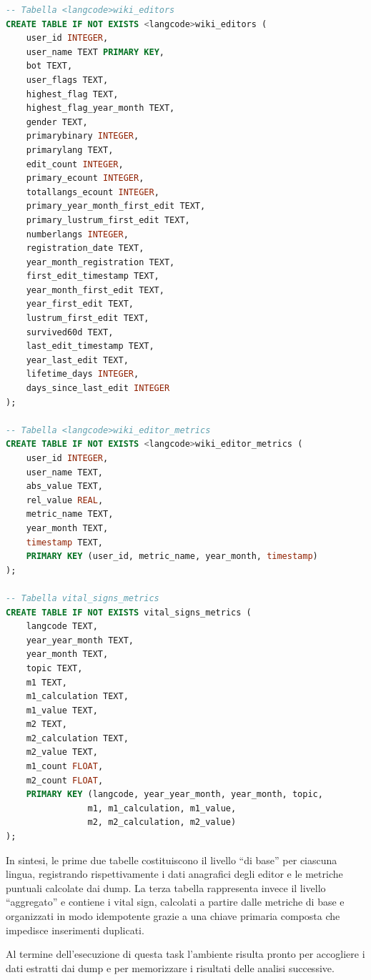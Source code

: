 \begin{lstlisting}[language=SQL, caption={Definizione delle tabelle create dalla task create\_dbs}, label=lst:create_dbs_tables, basicstyle=\scriptsize\ttfamily]
-- Tabella <langcode>wiki_editors
CREATE TABLE IF NOT EXISTS <langcode>wiki_editors (
    user_id INTEGER,
    user_name TEXT PRIMARY KEY,
    bot TEXT,
    user_flags TEXT,
    highest_flag TEXT,
    highest_flag_year_month TEXT,
    gender TEXT,
    primarybinary INTEGER,
    primarylang TEXT,
    edit_count INTEGER,
    primary_ecount INTEGER,
    totallangs_ecount INTEGER,
    primary_year_month_first_edit TEXT,
    primary_lustrum_first_edit TEXT,
    numberlangs INTEGER,
    registration_date TEXT,
    year_month_registration TEXT,
    first_edit_timestamp TEXT,
    year_month_first_edit TEXT,
    year_first_edit TEXT,
    lustrum_first_edit TEXT,
    survived60d TEXT,
    last_edit_timestamp TEXT,
    year_last_edit TEXT,
    lifetime_days INTEGER,
    days_since_last_edit INTEGER
);

-- Tabella <langcode>wiki_editor_metrics
CREATE TABLE IF NOT EXISTS <langcode>wiki_editor_metrics (
    user_id INTEGER,
    user_name TEXT,
    abs_value TEXT,
    rel_value REAL,
    metric_name TEXT,
    year_month TEXT,
    timestamp TEXT,
    PRIMARY KEY (user_id, metric_name, year_month, timestamp)
);

-- Tabella vital_signs_metrics
CREATE TABLE IF NOT EXISTS vital_signs_metrics (
    langcode TEXT,
    year_year_month TEXT,
    year_month TEXT,
    topic TEXT,
    m1 TEXT,
    m1_calculation TEXT,
    m1_value TEXT,
    m2 TEXT,
    m2_calculation TEXT,
    m2_value TEXT,
    m1_count FLOAT,
    m2_count FLOAT,
    PRIMARY KEY (langcode, year_year_month, year_month, topic, 
                m1, m1_calculation, m1_value, 
                m2, m2_calculation, m2_value)
);
\end{lstlisting}

In sintesi, le prime due tabelle costituiscono il livello “di base” per ciascuna lingua, registrando rispettivamente i dati anagrafici degli editor e le metriche puntuali calcolate dai dump. 
La terza tabella rappresenta invece il livello “aggregato” e contiene i vital sign, calcolati a partire dalle metriche di base e organizzati in modo idempotente grazie a una chiave primaria composta che impedisce inserimenti duplicati.  

Al termine dell’esecuzione di questa task l’ambiente risulta pronto per accogliere i dati estratti dai dump e per memorizzare i risultati delle analisi successive.

